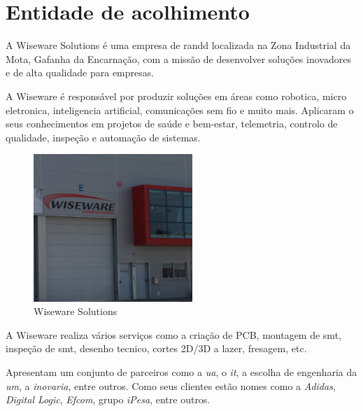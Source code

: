 \chapter{Entidade de acolhimento}%
\label{chapter:entidade}

A Wiseware Solutions é uma empresa de \acs{randd} localizada na Zona Industrial da Mota, Gafanha da Encarnação, com a missão de desenvolver soluções inovadores e de alta qualidade para empresas.

A Wiseware é responsável por produzir soluções em áreas como robotica, micro eletronica, inteligencia artificial, comunicações sem fio e muito mais. Aplicaram o seus conhecimentos em projetos de saúde e bem-estar, telemetria, controlo de qualidade, inspeção e automação de sistemas.

\begin{figure}[h!]
	\centering
    \includegraphics[width=6cm]{figs/wiseware.png}
    \caption[WiseWare Solutions]{Wiseware Solutions}
    \label{fig:company}
\end{figure}

A Wiseware realiza vários serviços como a criação de PCB, montagem de \acs{smt}, inspeção de \acs{smt}, desenho tecnico, cortes 2D/3D a lazer, fresagem, etc.

Apresentam um conjunto de parceiros como a \textit{\ac{ua}}, o \textit{\ac{it}}, a escolha de engenharia da \textit{\ac{um}}, a \textit{inovaria}, entre outros. Como seus clientes estão nomes como a \textit{Adidas}, \textit{Digital Logic}, \textit{Efcom}, grupo \textit{iPesa}, entre outros.